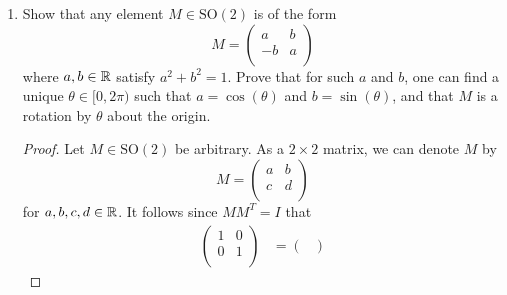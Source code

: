 \documentclass[../psets.tex]{subfiles}
\begin{document}
\begin{enumerate}
\begin{enumerate}
\begin{proof}
            If $\det(M)=1$, $\det(M^T)=1$, so $M\in\text{SO}(n)$ implies that $M^T\in\text{SO}(n)$. As in part (a), we can show that $M^T=M^{-1}$.\par
            The proof that composition is associative is entirely symmetric to that given in part (a).\par
            To prove that $\text{SO}(n)$ is closed under composition, we supplement the proof in part (a) with the fact that if $A,B$ have determinant equal to one, then
            \begin{equation*}
                \det(AB) = \det(A)\det(B)
                = 1\cdot 1
                = 1
            \end{equation*}
            as desired.
        \end{proof}
        \item Show that any element $M\in\text{SO}(2)$ is of the form
        \begin{equation*}
            M =
            \begin{pmatrix}
                a & b\\
                -b & a\\
            \end{pmatrix}
        \end{equation*}
        where $a,b\in\mathbb{R}$ satisfy $a^2+b^2=1$. Prove that for such $a$ and $b$, one can find a unique $\theta\in[0,2\pi)$ such that $a=\cos(\theta)$ and $b=\sin(\theta)$, and that $M$ is a rotation by $\theta$ about the origin.
        \begin{proof}
            Let $M\in\text{SO}(2)$ be arbitrary. As a $2\times 2$ matrix, we can denote $M$ by
            \begin{equation*}
                M =
                \begin{pmatrix}
                    a & b\\
                    c & d\\
                \end{pmatrix}
            \end{equation*}
            for $a,b,c,d\in\mathbb{R}$. It follows since $MM^T=I$ that
            \begin{align*}
                \begin{pmatrix}
                    1 & 0\\
                    0 & 1\\
                \end{pmatrix}
                &=
                \begin{pmatrix}

\end{pmatrix}
\end{align*}
\end{proof}
\end{enumerate}
\end{enumerate}
\end{document}
